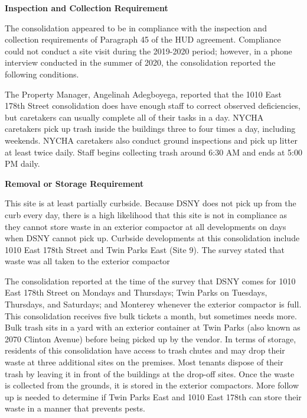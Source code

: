  

\textbf{Inspection and Collection Requirement} 

 

The consolidation appeared to be in compliance with the inspection and collection requirements of Paragraph 45 of the HUD agreement. Compliance could not conduct a site visit during the 2019-2020 period; however, in a phone interview conducted in the summer of 2020, the consolidation reported the following conditions.

The Property Manager, Angelinah Adegboyega, reported that the 1010 East 178th Street consolidation does have enough staff to correct observed deficiencies, but caretakers can usually complete all of their tasks in a day. NYCHA caretakers pick up trash inside the buildings three to four times a day, including weekends. NYCHA caretakers also conduct ground inspections and pick up litter at least twice daily. Staff begins collecting trash around 6:30 AM and ends at 5:00 PM daily. 

 

\textbf{Removal or Storage Requirement} 

 

This site is at least partially curbside. Because DSNY does not pick up from the curb every day, there is a high likelihood that this site is not in compliance as they cannot store waste in an exterior compactor at all developments on days when DSNY cannot pick up.  Curbside developments at this consolidation include 1010 East 178th Street and Twin Parks East (Site 9). The survey stated that waste was all taken to the exterior compactor 

 

The consolidation reported at the time of the survey that DSNY comes for 1010 East 178th Street on Mondays and Thursdays; Twin Parks on Tuesdays, Thursdays, and Saturdays; and Monterey whenever the exterior compactor is full. This consolidation receives five bulk tickets a month, but sometimes needs more. Bulk trash sits in a yard with an exterior container at Twin Parks (also known as 2070 Clinton Avenue) before being picked up by the vendor.  In terms of storage, residents of this consolidation have access to trash chutes and may drop their waste at three additional sites on the premises. Most tenants dispose of their trash by leaving it in front of the buildings at the drop-off sites. Once the waste is collected from the grounds, it is stored in the exterior compactors. More follow up is needed to determine if Twin Parks East and 1010 East 178th can store their waste in a manner that prevents pests.  

